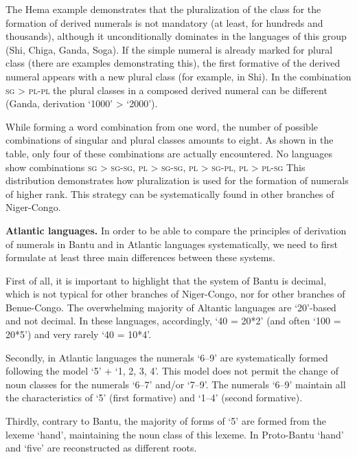 The Hema example demonstrates that the pluralization of the class for the formation of derived numerals is not mandatory (at least, for hundreds and thousands), although it unconditionally dominates in the languages of this group (Shi, Chiga, Ganda, Soga). If the simple numeral is already marked for plural class (there are examples demonstrating this), the first formative of the derived numeral appears with a new plural class (for example, in Shi). In the combination \textsc{sg} > \textsc{pl}-\textsc{pl} the plural classes in a composed derived numeral can be different (Ganda, derivation ‘1000’ > ‘2000’). 

While forming a word combination from one word, the number of possible combinations of singular and plural classes amounts to eight. As shown in the table, only four of these combinations are actually encountered. No languages show combinations \textsc{sg} > \textsc{sg}-\textsc{sg}, \textsc{pl} > \textsc{sg}-\textsc{sg}, \textsc{pl} > \textsc{sg}-\textsc{pl}, \textsc{pl} > \textsc{pl}-\textsc{sg} This distribution demonstrates how pluralization is used for the formation of numerals of higher rank. This strategy can be systematically found in other branches of Niger-Congo. 

\textbf{Atlantic languages.} In order to be able to compare the principles of derivation of numerals in Bantu and in Atlantic languages systematically, we need to first formulate at least three main differences between these systems.  

First of all, it is important to highlight that the system of Bantu is decimal, which is not typical for other branches of Niger-Congo, nor for other branches of Benue-Congo. The overwhelming majority of Altantic languages are ‘20’-based and not decimal. In these languages, accordingly, ‘40 = 20*2’ (and often ‘100 = 20*5’) and very rarely ‘40 = 10*4’.

Secondly, in Atlantic languages the numerals ‘6--9’ are systematically formed following the model ‘5’ + ‘1, 2, 3, 4’. This model does not permit the change of noun classes for the numerals ‘6--7’ and/or ‘7--9’. The numerals ‘6--9’ maintain all the characteristics of `5' (first formative) and ‘1--4’ (second formative). 

Thirdly, contrary to Bantu, the majority of forms of ‘5’ are formed from the lexeme ‘hand’, maintaining the noun class of this lexeme. In Proto-Bantu ‘hand’ and ‘five’ are reconstructed as different roots. 

